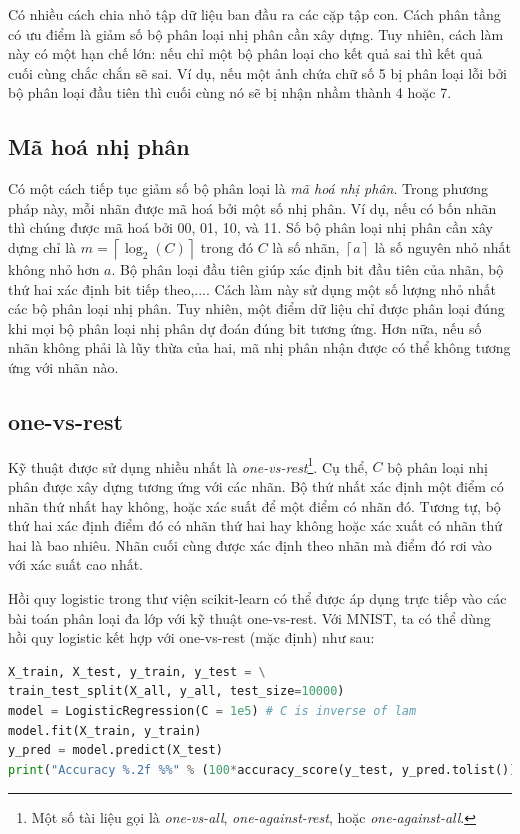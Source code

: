 Có nhiều cách chia nhỏ tập dữ liệu ban đầu ra các cặp tập con. Cách phân tầng có ưu điểm là giảm số bộ phân loại nhị phân cần xây dựng. Tuy nhiên, cách làm này có một hạn chế lớn: nếu chỉ một bộ phân loại cho kết quả sai thì kết quả cuối cùng chắc chắn sẽ sai. Ví dụ, nếu một ảnh chứa chữ
số {5} bị phân loại lỗi bởi bộ phân loại đầu tiên thì cuối cùng nó sẽ bị nhận nhầm thành 4 hoặc 7.


\subsection{Mã hoá nhị phân}
Có một cách tiếp tục giảm số bộ phân loại là \textit{mã hoá nhị phân}. Trong phương pháp này, mỗi nhãn được mã hoá bởi một số nhị phân. Ví dụ, nếu có bốn nhãn thì chúng được mã hoá bởi 00, 01, 10, và 11. Số bộ phân loại nhị phân cần xây dựng chỉ là $m =
\left\lceil\log_2(C)\right\rceil$ trong đó $C$ là số nhãn, $\left\lceil a
\right\rceil$ là {số nguyên nhỏ nhất không nhỏ hơn} $a$. Bộ phân loại đầu tiên giúp xác định bit đầu tiên của nhãn, bộ thứ hai xác định bit tiếp theo,....
Cách làm này sử dụng một số lượng nhỏ nhất các bộ phân loại nhị phân. Tuy
nhiên, một điểm dữ liệu chỉ được phân loại đúng khi mọi bộ phân loại nhị phân dự đoán đúng bit tương ứng. Hơn nữa, nếu số nhãn không phải là lũy thừa của hai,
mã nhị phân nhận được có thể không tương ứng với nhãn nào.


\subsection{one-vs-rest}
Kỹ thuật được sử dụng nhiều nhất là \textit{one-vs-rest}\footnote{Một số tài
liệu gọi là \textit{one-vs-all}, \textit{one-against-rest}, hoặc
\textit{one-against-all}.}. Cụ thể, $C$ bộ phân loại nhị phân được xây dựng
tương ứng với các nhãn. Bộ thứ nhất xác định một điểm có nhãn thứ nhất hay
không, hoặc xác suất để một điểm có nhãn đó. Tương tự, bộ thứ hai xác định điểm
đó có nhãn thứ hai hay không hoặc xác xuất có nhãn thứ hai là bao nhiêu. Nhãn
cuối cùng được xác định theo nhãn mà điểm đó rơi vào với xác suất cao nhất.



Hồi quy logistic trong thư viện scikit-learn có thể được áp dụng trực tiếp
vào các bài toán phân loại đa lớp với kỹ thuật {one-vs-rest}. Với MNIST, ta có thể dùng hồi quy logistic kết hợp với one-vs-rest (mặc định) như sau:
\begin{lstlisting}[language=Python]
X_train, X_test, y_train, y_test = \
train_test_split(X_all, y_all, test_size=10000)
model = LogisticRegression(C = 1e5) # C is inverse of lam
model.fit(X_train, y_train)
y_pred = model.predict(X_test)
print("Accuracy %.2f %%" % (100*accuracy_score(y_test, y_pred.tolist())))
\end{lstlisting}

